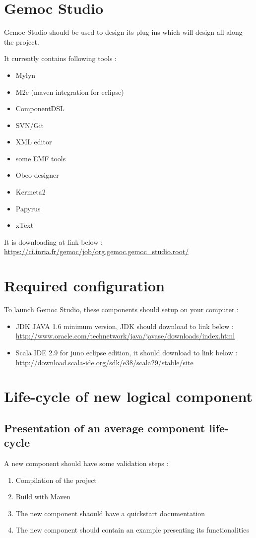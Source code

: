 \documentclass{gemoc} %
\begin{document}
\section{Gemoc Studio}
Gemoc Studio should be used to design its plug-ins which will design all along the project.

It currently contains following tools :
\begin{itemize}
	\item Mylyn
	\item M2e (maven integration for eclipse)
	\item ComponentDSL
	\item SVN/Git
	\item XML editor
	\item some EMF tools
	\item Obeo designer
	\item Kermeta2
	\item Papyrus
	\item xText
\end{itemize}
It is downloading at link below :
\newline
\url {https://ci.inria.fr/gemoc/job/org.gemoc.gemoc_studio.root/}
\section{Required configuration}
To launch Gemoc Studio, these components should setup on your computer :
\begin{itemize}
	\item JDK JAVA 1.6 minimum version, JDK should download to link below :
	\newline
	\url {http://www.oracle.com/technetwork/java/javase/downloads/index.html}
	\item Scala IDE 2.9 for juno eclipse edition, it should download to link below :
	\newline
	\url {http://download.scala-ide.org/sdk/e38/scala29/stable/site}
\end{itemize}
\section{Life-cycle of new logical component}
\subsection{Presentation of an average component life-cycle}
A new component should have some validation steps :
\begin{enumerate}[1]
	\item Compilation of the project
	\item Build with Maven
	\item The new component shaould have a quickstart documentation
	\item The new component should contain an example presenting its functionalities
\end{enumerate}
\end{document}
